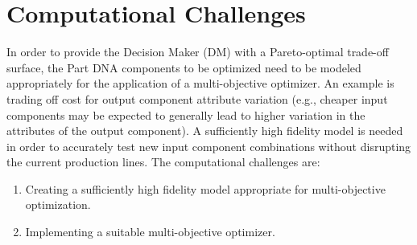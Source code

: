 \documentclass{IEEEtran}
\begin{document}
\section{Computational Challenges}
In order to provide the Decision Maker (DM) with a Pareto-optimal trade-off surface, the Part DNA components to be optimized need to be modeled appropriately for the application of a multi-objective optimizer. An example is trading off cost for output component attribute variation (e.g., cheaper input components may be expected to generally lead to higher variation in the attributes of the output component). A sufficiently high fidelity model is needed in order to accurately test new input component combinations without disrupting the current production lines. The computational challenges are:
\begin{enumerate}
\item Creating a sufficiently high fidelity model appropriate for multi-objective optimization.
\item Implementing a suitable multi-objective optimizer.
\end{enumerate}
\end{document}
